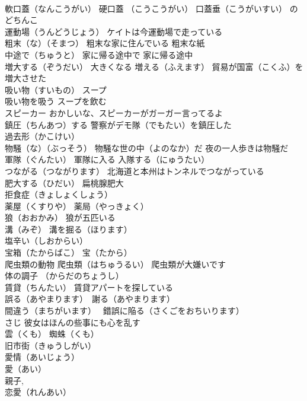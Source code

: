 \documentclass[8pt]{extreport}
\begin{document}
\begin{CJK}{UTF8}{min}
\\	軟口蓋（なんこうがい） 硬口蓋 （こうこうがい） 口蓋垂（こうがいすい） のどちんこ 
\\	運動場（うんどうじょう） ケイトは今運動場で走っている
\\	粗末（な）（そまつ） 粗末な家に住んでいる 粗末な紙
\\	中途で（ちゅうと） 家に帰る途中で 家に帰る途中
\\	増大する（ぞうだい） 大きくなる 増える（ふえます） 貿易が国富（こくふ）を増大させた
\\	吸い物（すいもの） スープ 
\\	吸い物を吸う スープを飲む
\\	スピーカー おかしいな、スピーカーがガーガー言ってるよ
\\	鎮圧（ちんあつ）する 警察がデモ隊（でもたい）を鎮圧した
\\	過去形（かこけい）
\\	物騒（な）（ぶっそう） 物騒な世の中（よのなか）だ 夜の一人歩きは物騒だ
\\	軍隊（ぐんたい） 軍隊に入る 入隊する（にゅうたい）
\\	つながる（つながります） 北海道と本州はトンネルでつながっている
\\	肥大する（ひだい） 扁桃腺肥大
\\	拒食症（きょしょくしょう）
\\	薬屋（くすりや） 薬局（やっきょく）
\\	狼（おおかみ） 狼が五匹いる
\\	溝（みぞ） 溝を掘る（ほります）
\\	塩辛い（しおからい）
\\	宝箱（たからばこ） 宝（たから）
\\	爬虫類の動物 爬虫類（はちゅうるい） 爬虫類が大嫌いです
\\	体の調子 （からだのちょうし）
\\	賃貸（ちんたい） 賃貸アパートを探している
\\	誤る（あやまります）　謝る（あやまります）
\\	間違う（まちがいます）　 錯誤に陥る（さくごをおちいります）
\\	さじ 彼女はほんの些事にも心を乱す
\\	雲（くも） 蜘蛛（くも）
\\	旧市街（きゅうしがい）
\\	愛情（あいじょう） 
\\	愛（あい） 
\\	親子, 
\\	恋愛（れんあい） 

\end{CJK}
\end{document}

